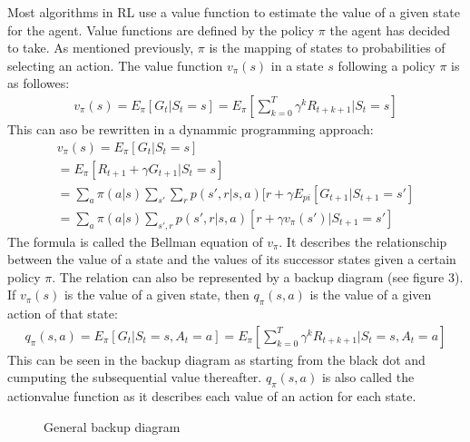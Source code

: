 \documentclass[letterpaper,10pt,english]{jupyterBook}
\let\sphinxpxdimen\pdfpxdimen\else\newdimen\sphinxpxdimen
\begin{document}
\sphinxAtStartPar
Most algorithms in RL use a value function to estimate the value of a given state for the agent. Value functions are defined by the policy \(\pi\) the agent has decided to take. As mentioned previously, \(\pi\) is the mapping of states to probabilities of selecting an action. The value function \(v_{\pi}(s)\) in a state \(s\) following a policy \(\pi\) is as followes:
\begin{equation*}
\begin{split} v_{\pi}(s) = E_{\pi}[G_t | S_t = s] = E_{\pi}[\sum_{k=0}^T \gamma^kR_{t+k+1} | S_t=s] \end{split}
\end{equation*}
\sphinxAtStartPar
This can aso be rewritten in a dynammic programming approach:
\begin{equation}\label{equation:Reinforcement_learning:my_label}
\begin{split}v_{\pi}(s) = E_{\pi}[G_t | S_t = s] \\
= E_{\pi}[R_{t+1} + \gamma G_{t+1} | S_t = s] \\
= \sum_a \pi(a|s) \sum_{s'} \sum_r p(s', r|s,a)[r + \gamma E_{pi}[G_{t+1} | S_{t+1} = s'] \\
= \sum_a \pi(a|s) \sum_{s', r}p(s', r|s,a)[r + \gamma v_{\pi}(s')| S_{t+1} = s'] \end{split}
\end{equation}
\sphinxAtStartPar
The formula is called the Bellman equation of \(v_{\pi}\). It describes the relationschip between the value of a state and the values of its successor states given a certain policy \(\pi\). The relation can also be represented by a backup diagram (see figure 3). If \(v_{\pi}(s)\) is the value of a given state, then \(q_{\pi}(s,a)\) is the value of a given action of that state:
\begin{equation*}
\begin{split} q_{\pi}(s,a) = E_{\pi}[G_t | S_t = s, A_t = a] = E_{\pi}[\sum_{k=0}^T \gamma^kR_{t+k+1} | S_t=s, A_t = a] \end{split}
\end{equation*}
\sphinxAtStartPar
This can be seen in the backup diagram as starting from the black dot and cumputing the subsequential value thereafter. \(q_{\pi}(s,a)\) is also called the action\sphinxhyphen{}value function as it describes each value of an action for each state.

\begin{figure}[htbp]
\centering
\capstart

\noindent\sphinxincludegraphics[width=300\sphinxpxdimen,height=250\sphinxpxdimen]{{backup_diagram}.png}
\caption{General backup diagram}\label{\detokenize{Reinforcement_learning:backup-diagram-fig}}\end{figure}
\end{document}
